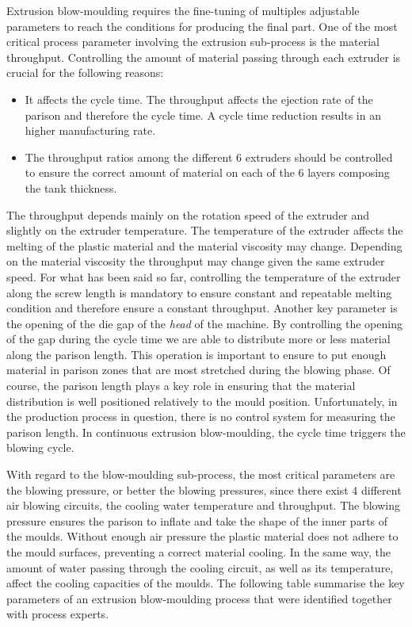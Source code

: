 Extrusion blow-moulding requires the fine-tuning of multiples adjustable parameters to reach the conditions for producing the final part. One of the most critical process parameter involving the extrusion sub-process is the material throughput. Controlling the amount of material passing through each extruder is crucial for the following reasons:  
%
\begin{itemize}
    \item It affects the cycle time. The throughput affects the ejection rate of the parison and therefore the cycle time. A cycle time reduction results in an higher manufacturing rate.
    \item The throughput ratios among the different 6 extruders should be controlled to ensure the correct amount of material on each of the 6 layers composing the tank thickness.
\end{itemize}
%
The throughput depends mainly on the rotation speed of the extruder and slightly on the extruder temperature. The temperature of the extruder affects the melting of the plastic material and the material viscosity may change. Depending on the material viscosity the throughput may change given the same extruder speed. For what has been said so far, controlling the temperature of the extruder along the screw length is mandatory to ensure constant and repeatable melting condition and therefore ensure a constant throughput. Another key parameter is the opening of the die gap of the \textit{head} of the machine. By controlling the opening of the gap during the cycle time we are able to distribute more or less material along the parison length. This operation is important to ensure to put enough material in parison zones that are most stretched during the blowing phase. Of course, the parison length plays a key role in ensuring that the material distribution is well positioned relatively to the mould position. Unfortunately, in the production process in question, there is no control system for measuring the parison length. In continuous extrusion blow-moulding, the cycle time triggers the blowing cycle.   

With regard to the blow-moulding sub-process, the most critical parameters are the blowing pressure, or better the blowing pressures, since there exist 4 different air blowing circuits, the cooling water temperature and throughput. The blowing pressure ensures the parison to inflate and take the shape of the inner parts of the moulds. Without enough air pressure the plastic material does not adhere to the mould surfaces, preventing a correct material cooling. In the same way, the amount of water passing through the cooling circuit, as well as its temperature, affect the cooling capacities of the moulds. The following table summarise the key parameters of an extrusion blow-moulding process that were identified together with process experts.

